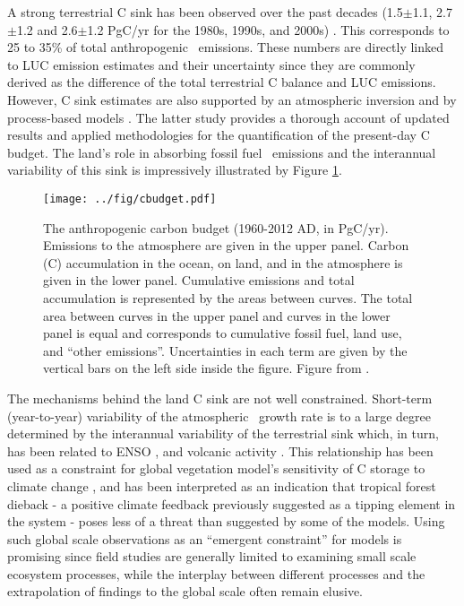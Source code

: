 A strong terrestrial C sink has been observed over the past decades (1.5$\pm$1.1, 2.7$\pm$1.2 and 2.6$\pm$1.2 PgC/yr for the 1980s, 1990s, and 2000s) \citep{ciais13ipcc}. This corresponds to 25 to 35\% of total anthropogenic \coo\ emissions. These numbers are directly linked to LUC emission estimates and their uncertainty since they are commonly derived as the difference of the total terrestrial C balance and LUC emissions. However, C sink estimates are also supported by an atmospheric inversion \citep{gurneyeckels11} and by process-based models \citep{lequere13essd}. The latter study provides a thorough account of updated results and applied methodologies for the quantification of the present-day C budget. The land's role in absorbing fossil fuel \coo\ emissions and the interannual variability of this sink is impressively illustrated by Figure \ref{fig:cbudget}.\\
\begin{figure}[ht]
\begin{center}
  \texttt{[image: ../fig/cbudget.pdf]}
\end{center}
  \caption[The anthropogenic carbon budget (1960-2012 AD)]{The anthropogenic carbon budget (1960-2012 AD, in PgC/yr). Emissions to the atmosphere are given in the upper panel. Carbon (C) accumulation in the ocean, on land, and in the atmosphere is given in the lower panel. Cumulative emissions and total accumulation is represented by the areas between curves. The total area between curves in the upper panel and curves in the lower panel is equal and corresponds to cumulative fossil fuel, land use, and ``other emissions''. Uncertainties in each term are given by the vertical bars on the left side inside the figure. Figure from \citet{lequere13essd}.}
\label{fig:cbudget}
\end{figure}

The mechanisms behind the land C sink are not well constrained. Short-term (year-to-year) variability of the atmospheric \coo\ growth rate is to a large degree determined by the interannual variability of the terrestrial sink which, in turn, has been related to ENSO \citep{raupach08}, and volcanic activity \citep{mercado09}. This relationship has been used as a constraint for global vegetation model's sensitivity of C storage to climate change \citep{cox13}, and has been interpreted as an indication that tropical forest dieback - a positive climate feedback previously suggested as a tipping element in the system \citep{lenton08} - poses less of a threat than suggested by some of the models. Using such global scale observations as an ``emergent constraint'' for models is promising since field studies are generally limited to examining small scale ecosystem processes, while the interplay between different processes and the extrapolation of findings to the global scale often remain elusive. \\

